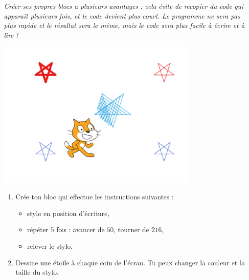 \documentclass[class=report,crop=false, 12pt]{standalone}
\begin{document}




\bigskip
\bigskip

\emph{Créer ses propres blocs a plusieurs avantages : cela évite de recopier du code qui apparaît plusieurs fois, et le code devient plus court. Le programme ne sera pas plus rapide et le résultat sera le même, mais le code sera plus facile à écrire et à lire !}

\bigskip
\bigskip


\begin{activite}

\sauteligne

\begin{center}
  \includegraphics[width=0.75\textwidth]{ecran-11-ex1} 
\end{center}

\begin{enumerate}
  \item Crée ton bloc  qui effectue les instructions suivantes :
    \begin{itemize}
      \item stylo en position d'écriture,
      \item répéter $5$ fois : avancer de $50$, tourner de $216$\textdegree,
      \item relever le stylo.
    \end{itemize}



  \item Dessine une étoile à chaque coin de l'écran. Tu peux changer la couleur et la taille du stylo.
  

\end{enumerate}
\end{activite}
\end{document}
